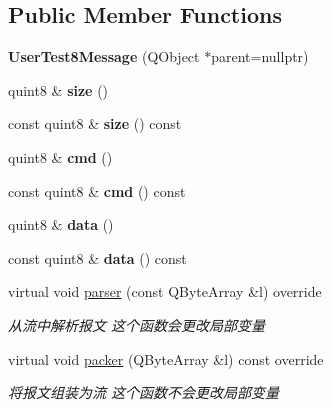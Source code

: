\subsection*{Public Member Functions}
\begin{DoxyCompactItemize}
\item 
\mbox{\label{class_user_test8_message_aa847b20333aae86dd7aef2e0b51627a4}} 
{\bfseries User\+Test8\+Message} (Q\+Object $\ast$parent=nullptr)
\item 
\mbox{\label{class_user_test8_message_ad404d49fc0d98f979531f4962e612174}} 
quint8 \& {\bfseries size} ()
\item 
\mbox{\label{class_user_test8_message_ae6a6cd17c70b82e0da39c72344f2fd21}} 
const quint8 \& {\bfseries size} () const
\item 
\mbox{\label{class_user_test8_message_a23c07f8c5dd86496492a029fc137b3ec}} 
quint8 \& {\bfseries cmd} ()
\item 
\mbox{\label{class_user_test8_message_a1616bedf61e343a1e3a87e333355f243}} 
const quint8 \& {\bfseries cmd} () const
\item 
\mbox{\label{class_user_test8_message_a59e44af016a2e7bcfcd72a11d485c9e1}} 
quint8 \& {\bfseries data} ()
\item 
\mbox{\label{class_user_test8_message_a921868b204f60d4ccec29cd41225607c}} 
const quint8 \& {\bfseries data} () const
\item 
virtual void \mbox{\hyperlink{class_user_test8_message_a5dbafc420f4b46bbaafc67541df709c4}{parser}} (const Q\+Byte\+Array \&l) override
\begin{DoxyCompactList}\small\item\em 从流中解析报文 这个函数会更改局部变量 \end{DoxyCompactList}\item 
virtual void \mbox{\hyperlink{class_user_test8_message_adb7a902be87629d32761d5bd23a23d05}{packer}} (Q\+Byte\+Array \&l) const override
\begin{DoxyCompactList}\small\item\em 将报文组装为流 这个函数不会更改局部变量 \end{DoxyCompactList}\end{DoxyCompactItemize}


